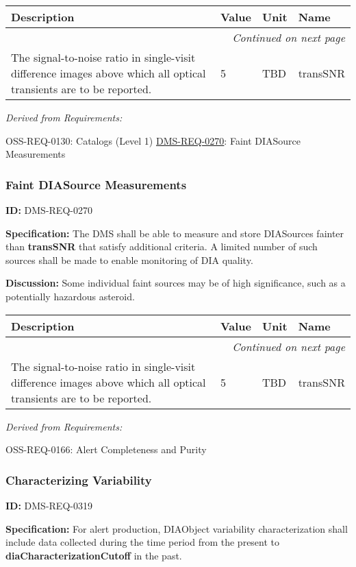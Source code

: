 \documentclass[SE,toc,lsstdraft]{lsstdoc}
\makeatletter
\newcommand{\paramname}[1]{\hspace{0pt}#1}
\newcommand{\unitname}[1]{\hspace{0pt}#1}
\newenvironment{parameters}[0]{%
\setlength\LTleft{0pt}
\setlength\LTright{\fill}
\begin{small}
\begin{longtable}[]{|p{0.5\textwidth}|l|p{0.6in}|p{1.74in}@{}|}

\hline \textbf{Description} & \textbf{Value} & \textbf{Unit} & \textbf{Name} \\ \hline
\endhead

\hline \multicolumn{4}{r}{\emph{Continued on next page}} \\
\endfoot

\hline\hline
\endlastfoot
}{%
\hline
\end{longtable}
\end{small}
}
\makeatother
\begin{document}
\begin{parameters}
The signal-to-noise ratio in single-visit difference images above which all optical transients are to be reported.
&
5
&
\unitname{%
TBD
}
&
\paramname{%
transSNR
} \\\hline
\end{parameters}




\emph{Derived from Requirements:}

OSS-REQ-0130:
Catalogs (Level 1) \newline
\hyperref[DMS-REQ-0270]{DMS-REQ-0270}:
Faint DIASource Measurements \newline


\subsubsection{Faint DIASource Measurements}

\label{DMS-REQ-0270}
\textbf{ID:} DMS-REQ-0270

\textbf{Specification:} The DMS shall be able to measure and store DIASources fainter than \textbf{transSNR }that satisfy additional criteria. A limited number of such sources shall be made to enable monitoring of DIA quality.

\textbf{Discussion: }Some individual faint sources may be of high significance, such as a potentially hazardous asteroid.



\begin{parameters}
The signal-to-noise ratio in single-visit difference images above which all optical transients are to be reported.
&
5
&
\unitname{%
TBD
}
&
\paramname{%
transSNR
} \\\hline
\end{parameters}




\emph{Derived from Requirements:}

OSS-REQ-0166:
Alert Completeness and Purity \newline


\subsubsection{Characterizing Variability}

\label{DMS-REQ-0319}
\textbf{ID:} DMS-REQ-0319

    \textbf{Specification:} For alert production, DIAObject variability characterization shall include data collected during the time period from the present to \textbf{diaCharacterizationCutoff} in the past.
\end{document}
